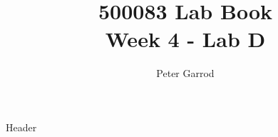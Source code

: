 \documentclass{article}
\title{%
    500083 Lab Book \\
    \large Week 4 - Lab D
    }
\author{Peter Garrod}
\begin{document}
    \maketitle
    \tableofcontents
    \newpage

    {Header}
\end{document}
